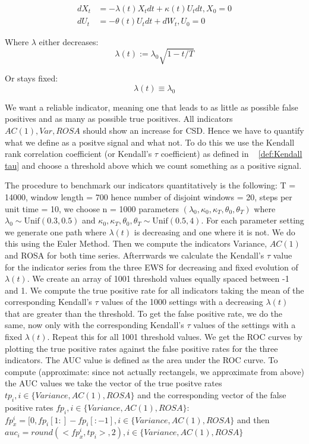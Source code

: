 \documentclass[%
thesis=student,%
coverpage=false,%
titlepage=false,%
headmarks=true, %
german,%
font=libertine, %
math=newpxtx, %
BCOR=5mm,%
coverBCOR=11mm%
]{tumbook}
\begin{document}
\begin{subequations}
    \begin{align*}
        dX_{t} &= -\lambda(t) X_{t}dt + \kappa(t) U_{t}dt, X_{0} = 0 \\
        dU_{t} &= -\theta(t) U_{t}dt + dW_{t}, U_{0} = 0
    \end{align*}
\end{subequations}

Where $\lambda$ either decreases: 
    \[
    \lambda(t) := \lambda_{0}\sqrt{1-t/T}
    \]

Or stays fixed: 
    \[
    \lambda(t)\equiv\lambda_{0}
    \]

We want a reliable indicator, meaning one that leads to as little as possible false positives and as many as possible true positives. All indicators $AC(1),Var,ROSA$ should show an increase for CSD. Hence we have to quantify what we define as a positve signal and what not. To do this we use the Kendall rank correlation coefficient (or Kendall's $\tau$ coefficient) as defined in ~ \ref{def:Kendall tau} and choose a threshold above which we count something as a positive signal. 


The procedure to benchmark our indicators quantitatively is the following:
T = 14000, window length = 700 hence number of disjoint windows = 20, steps per unit time = 10, we choose n = 1000 parameters $(\lambda_{0},\kappa_{0},\kappa_{T},\theta_{0},\theta_{T})$ where $\lambda_{0} \sim \text{Unif}(0.3,0.5)$ and $\kappa_{0},\kappa_{T},\theta_{0},\theta_{T} \sim \text{Unif}(0.5,4)$. For each parameter setting we generate one path where $\lambda(t)$ is decreasing and one where it is not. We do this using the Euler Method. Then we compute the indicators Variance, $AC(1)$ and ROSA for both time series. Afterrwards we calculate the Kendall's $\tau$ value for the indicator series from the three EWS for decreasing and fixed evolution of $\lambda(t)$. We create an array of 1001 threshold values equally spaced between -1 and 1. We compute the true positive rate for all indicators taking the mean of the corresponding Kendall's $\tau$ values of the 1000 settings with a decreasing $\lambda(t)$ that are greater than the threshold. To get the false positive rate, we do the same, now only with the corresponding Kendall's $\tau$ values of the settings with a fixed $\lambda(t)$. Repeat this for all 1001 threshold values. We get the ROC curves by plotting the true positive rates against the false positive rates for the three indicators.
The AUC value is defined as the area under the ROC curve. To compute (approximate: since not actually rectangels, we approximate from above) the AUC values we take the vector of the true positve rates  $tp_{i}, i \in \{Variance,AC(1),ROSA\}$ and the corresponding vector of the false positive rates $fp_{i}, i \in \{Variance,AC(1),ROSA\}$: $fp_{x}^{i} = [0,fp_{i}[1:]-fp_{i}[:-1], i \in \{Variance,AC(1),ROSA\}$ and then $auc_{i} = round(<fp_{x}^{i},tp_{i}>,2), i \in \{Variance,AC(1),ROSA\}$
\end{document}

